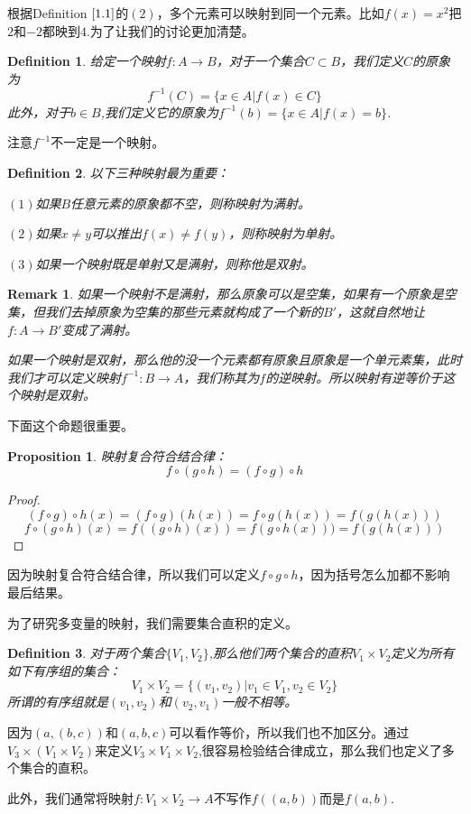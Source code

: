 \documentclass[11pt,a4paper,openany]{book}%
\theoremstyle{plain}%
\newtheorem{pro}{Proposition}[chapter]%
\newtheorem*{rem}{Remark}%
\newtheorem{defi}{Definition}[chapter]%
\newcommand{\NO}[1]{{$(#1)$}}%
\newcommand{\dref}[1]{{\rm Definition} $\ref{#1}$}%
\begin{document}
根据\dref{1.1}的\NO{2}，多个元素可以映射到同一个元素。比如$f(x)=x^2$把$2$和$-2$都映到$4$.为了让我们的讨论更加清楚。
\begin{defi}
给定一个映射$f:A\rightarrow B$，对于一个集合$C\subset B$，我们定义$C$的原象为
\[
f^{-1}(C)=\{x\in A|f(x)\in C\}
\]
此外，对于$b\in B$,我们定义它的原象为$f^{-1}(b)=\{x\in A |f(x)=b\}$.
\end{defi}
注意$f^{-1}$不一定是一个映射。
\begin{defi}以下三种映射最为重要：

\NO{1}如果$B$任意元素的原象都不空，则称映射为满射。

\NO{2}如果$x \neq y$可以推出$f(x) \neq f(y)$，则称映射为单射。

\NO{3}如果一个映射既是单射又是满射，则称他是双射。
\end{defi}
\begin{rem}
如果一个映射不是满射，那么原象可以是空集，如果有一个原象是空集，但我们去掉原象为空集的那些元素就构成了一个新的$B'$，这就自然地让$f:A\rightarrow B'$变成了满射。

如果一个映射是双射，那么他的没一个元素都有原象且原象是一个单元素集，此时我们才可以定义映射$f^{-1}:B\rightarrow A$，我们称其为$f$的逆映射。所以映射有逆等价于这个映射是双射。
\end{rem}
下面这个命题很重要。
\begin{pro}映射复合符合结合律：
\[
f \circ (g \circ h)=(f \circ g) \circ h
\]
\end{pro}
\begin{proof}
\[
(f \circ g) \circ h(x)=(f \circ g)(h(x))=f \circ g(h(x))=f(g(h(x)))
\]
\[
f \circ (g\circ h)(x)=f((g \circ h)(x))=f(g \circ h (x)))=f(g(h(x)))
\]
\end{proof}
因为映射复合符合结合律，所以我们可以定义$f \circ g \circ h$，因为括号怎么加都不影响最后结果。

为了研究多变量的映射，我们需要集合直积的定义。
\begin{defi}
对于两个集合$\{V_1,V_2\}$,那么他们两个集合的直积$V_1\times V_2$定义为所有如下有序组的集合：
\[
V_1\times V_2=\{(v_1,v_2)|v_1\in V_1, v_2\in V_2\}
\]
所谓的有序组就是$(v_1,v_2)$和$(v_2,v_1)$一般不相等。
\end{defi}
因为$(a,(b,c))$和$(a,b,c)$可以看作等价，所以我们也不加区分。通过$V_3\times (V_1\times V_2)$来定义$V_3\times V_1\times V_2$,很容易检验结合律成立，那么我们也定义了多个集合的直积。

此外，我们通常将映射$f:V_1\times V_2 \rightarrow A$不写作$f((a,b))$而是$f(a,b)$.
\end{document}
